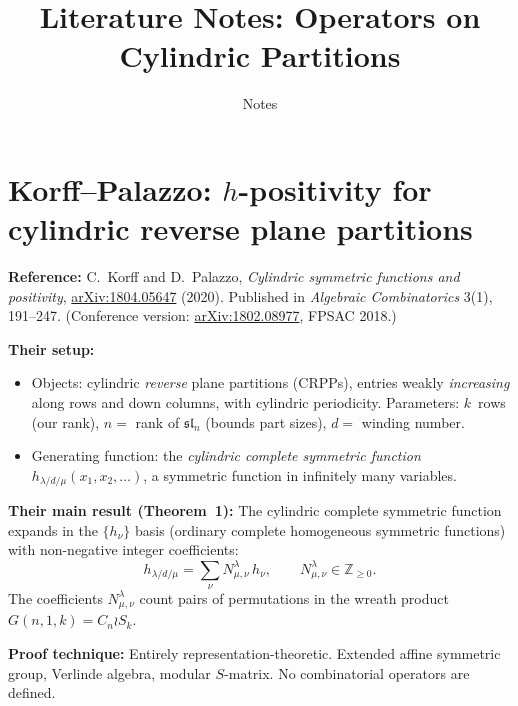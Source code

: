 \documentclass[11pt]{article}
\title{Literature Notes: Operators on Cylindric Partitions}
\author{Notes}
\date{}
\begin{document}
\maketitle

\section{Korff--Palazzo: $h$-positivity for cylindric reverse plane partitions}

\textbf{Reference:} C.~Korff and D.~Palazzo,
\emph{Cylindric symmetric functions and positivity},
\href{https://arxiv.org/abs/1804.05647}{arXiv:1804.05647} (2020).
Published in \emph{Algebraic Combinatorics} 3(1), 191--247.
(Conference version: \href{https://arxiv.org/abs/1802.08977}{arXiv:1802.08977}, FPSAC 2018.)

\medskip
\noindent\textbf{Their setup:}
\begin{itemize}
  \item Objects: cylindric \emph{reverse} plane partitions (CRPPs),
    entries weakly \emph{increasing} along rows and down columns,
    with cylindric periodicity.  Parameters: $k$~rows (our rank),
    $n = $ rank of $\mathfrak{sl}_n$ (bounds part sizes),
    $d = $ winding number.
  \item Generating function: the \emph{cylindric complete symmetric
    function} $h_{\lambda/d/\mu}(x_1, x_2, \ldots)$, a symmetric
    function in infinitely many variables.
\end{itemize}

\medskip
\noindent\textbf{Their main result (Theorem~1):}
The cylindric complete symmetric function expands in the
$\{h_\nu\}$ basis (ordinary complete homogeneous symmetric functions)
with non-negative integer coefficients:
\[
  h_{\lambda/d/\mu} = \sum_\nu N^{\lambda}_{\mu,\nu}\, h_\nu,
  \qquad N^{\lambda}_{\mu,\nu} \in \mathbb{Z}_{\geq 0}.
\]
The coefficients $N^{\lambda}_{\mu,\nu}$ count pairs of permutations
in the wreath product $G(n,1,k) = C_n \wr S_k$.

\medskip
\noindent\textbf{Proof technique:} Entirely representation-theoretic.
Extended affine symmetric group, Verlinde algebra, modular $S$-matrix.
No combinatorial operators are defined.
\end{document}
